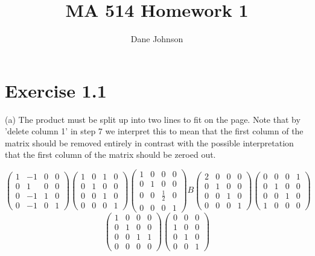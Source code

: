 \documentclass[11pt]{article}
\title{MA 514 Homework 1}
\author{Dane Johnson}
\begin{document}
\maketitle

\section*{Exercise 1.1}

(a) The product must be split up into two lines to fit on the page. Note that by 'delete column 1' in step 7 we interpret this to mean that the first column of the matrix should be removed entirely in contrast with the possible interpretation that the first column of the matrix should be zeroed out. 

$$\begin{pmatrix}
1 & -1 & 0 & 0 \\ 0 &1 & 0 & 0 \\ 0 & -1 & 1 & 0 \\ 0 &-1 &0 & 1
\end{pmatrix}
\begin{pmatrix}
1 & 0 & 1 & 0 \\ 0 &1 & 0 & 0 \\ 0 & 0 & 1 & 0 \\ 0 & 0 &0 & 1
\end{pmatrix}
\begin{pmatrix}
1 & 0 & 0 & 0 \\ 0 &1 & 0 & 0 \\ 0 & 0 & \frac{1}{2} & 0 \\ 0 & 0 &0 & 1
\end{pmatrix}
B
\begin{pmatrix}
2 & 0 & 0 & 0 \\ 0 &1 & 0 & 0 \\ 0 & 0 & 1 & 0 \\ 0 & 0 &0 & 1
\end{pmatrix}
\begin{pmatrix}
0 & 0 & 0 & 1 \\ 0 &1 & 0 & 0 \\ 0 & 0 & 1 & 0 \\ 1 & 0 &0 & 0
\end{pmatrix}
$$
$$
\begin{pmatrix}
1 & 0 & 0 & 0 \\ 0 &1 & 0 & 0 \\ 0 & 0 & 1 & 1 \\ 0 & 0 &0 & 0
\end{pmatrix}
\begin{pmatrix}
0 & 0 & 0 \\ 1 & 0 & 0 \\  0 & 1 & 0\\  0 &0 & 1
\end{pmatrix}
$$
\end{document}

